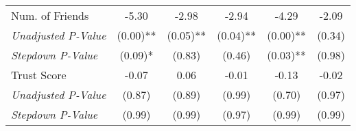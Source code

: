 \begin{tabular}{l c c c c c}
Num. of Friends & -5.30 & -2.98 & -2.94 & -4.29 & -2.09 \\
\quad \textit{Unadjusted P-Value} & (0.00)** & (0.05)** & (0.04)** & (0.00)** & (0.34) \\
\quad \textit{Stepdown P-Value} & (0.09)* & (0.83) & (0.46) & (0.03)** & (0.98) \\
Trust Score & -0.07 & 0.06 & -0.01 & -0.13 & -0.02 \\
\quad \textit{Unadjusted P-Value} & (0.87) & (0.89) & (0.99) & (0.70) & (0.97) \\
\quad \textit{Stepdown P-Value} & (0.99) & (0.99) & (0.97) & (0.99) & (0.99) \\
\bottomrule
\end{tabular}
